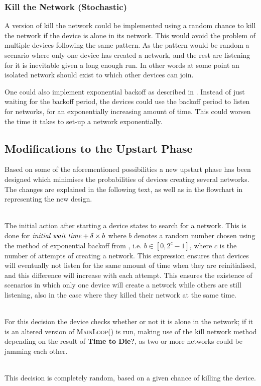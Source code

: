 \subsubsection{Kill the Network (Stochastic)}\label{KtNR}
A version of kill the network could be implemented using a random chance to kill the network if the device is alone in its network.
This would avoid the problem of multiple devices following the same pattern.
As the pattern would be random a scenario where only one device has created a network, and the rest are listening for it is inevitable given a long enough run.
In other words at some point an isolated network should exist to which other devices can join.

One could also implement exponential backoff as described in .
Instead of just waiting for the backoff period, the devices could use the backoff period to listen for networks, for an exponentially increasing amount of time. 
This could worsen the time it takes to set-up a network exponentially.

\subsection{Modifications to the Upstart Phase}                 
Based on some of the aforementioned possibilities a new upstart phase has been designed which minimises the probabilities of devices creating several networks.
The changes are explained in the following text, as well as in the flowchart in  representing the new design.

\begin{description}[labelindent=\parindent]
    \item[Search for network]\hfill\\
    The initial action after starting a device states to search for a network.
    This is done for $\text{\textit{initial wait time}} + \delta \times b$ where $b$ denotes a random number chosen using the method of exponential backoff from , i.e. $b \in [0, 2^c-1]$, where $c$ is the number of attempts of creating a network.
    This expression ensures that devices will eventually not listen for the same amount of time when they are reinitialised, and this difference will increase with each attempt. This ensures the existence of scenarios in which only one device will create a network while others are still listening, also in the case where they killed their network at the same time.
    \item[Alone in network?]\hfill\\
    For this decision the device checks whether or not it is alone in the network; if it is an altered version of \textsc{MainLoop()} is run, making use of the kill network method depending on the result of \textbf{Time to Die?}, as two or more networks could be jamming each other.
    \item[Time to Die?]\hfill\\
    This decision is completely random, based on a given chance of killing the device.
\end{description}

